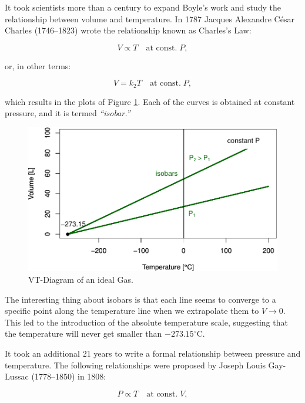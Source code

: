 \documentclass[
  9pt,
]{extbook}
\theoremstyle{definition}
\theoremstyle{definition}
\theoremstyle{definition}
\theoremstyle{remark}
\begin{document}
It took scientists more than a century to expand Boyle's work and study the relationship between volume and temperature. In 1787 Jacques Alexandre César Charles (1746--1823) wrote the relationship known as Charles's Law:

\begin{equation}
V\propto T\quad\text{at const.}\;P,
\label{eq:charleslaw1}
\end{equation}

or, in other terms:

\begin{equation}
V=k_2 T\quad\text{at const.}\;P,
\label{eq:charleslaw2}
\end{equation}

which results in the plots of Figure \ref{fig:FigTVideal}. Each of the curves is obtained at constant pressure, and it is termed \emph{``isobar.''}

\begin{figure}

{\centering \includegraphics[width=0.7\linewidth]{pchem1_files/figure-latex/FigTVideal-1} 

}

\caption{VT-Diagram of an ideal Gas.}\label{fig:FigTVideal}
\end{figure}

The interesting thing about isobars is that each line seems to converge to a specific point along the temperature line when we extrapolate them to \(V\rightarrow 0\). This led to the introduction of the absolute temperature scale, suggesting that the temperature will never get smaller than \(-273.15^\circ\mathrm{C}\).

It took an additional 21 years to write a formal relationship between pressure and temperature. The following relationships were proposed by Joseph Louis Gay-Lussac (1778--1850) in 1808:

\begin{equation}
P\propto T\quad\text{at const.}\;V,
\label{eq:gaylussac1}
\end{equation}
\end{document}
